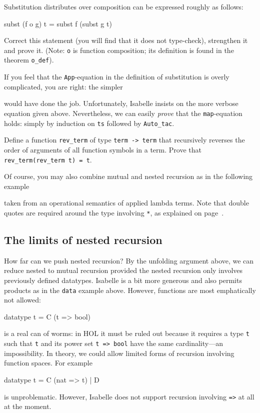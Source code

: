 \begin{exercise}
Substitution distributes over composition can be expressed roughly as
follows:
\begin{ttbox}
subst (f o g) t = subst f (subst g t)
\end{ttbox}
Correct this statement (you will find that it does not type-check),
strengthen it and prove it. (Note: \texttt{o} is function composition; its
definition is found in the theorem \texttt{o_def}).
\end{exercise}

If you feel that the \texttt{App}-equation in the definition of substitution
is overly complicated, you are right: the simpler
\begin{ttbox}
\end{ttbox}
would have done the job. Unfortunately, Isabelle insists on the more verbose
equation given above. Nevertheless, we can easily {\em prove} that the
\texttt{map}-equation holds: simply by induction on \texttt{ts} followed by
\texttt{Auto_tac}.


\begin{exercise}
  Define a function \texttt{rev_term} of type \texttt{term -> term} that
  recursively reverses the order of arguments of all function symbols in a
  term. Prove that \texttt{rev_term(rev_term t) = t}.
\end{exercise}

Of course, you may also combine mutual and nested recursion as in the
following example
\begin{ttbox}
\end{ttbox}
taken from an operational semantics of applied lambda terms. Note that double
quotes are required around the type involving \texttt{*}, as explained on
page~\pageref{startype}.

\subsection{The limits of nested recursion}

How far can we push nested recursion? By the unfolding argument above, we can
reduce nested to mutual recursion provided the nested recursion only involves
previously defined datatypes. Isabelle is a bit more generous and also permits
products as in the \texttt{data} example above.
However, functions are most emphatically not allowed:
\begin{ttbox}
datatype t = C (t => bool)
\end{ttbox}
is a real can of worms: in HOL it must be ruled out because it requires a
type \texttt{t} such that \texttt{t} and its power set \texttt{t => bool}
have the same cardinality---an impossibility.
In theory, we could allow limited forms of recursion involving function
spaces. For example
\begin{ttbox}
datatype t = C (nat => t) | D
\end{ttbox}
is unproblematic. However, Isabelle does not support recursion involving
\texttt{=>} at all at the moment.

